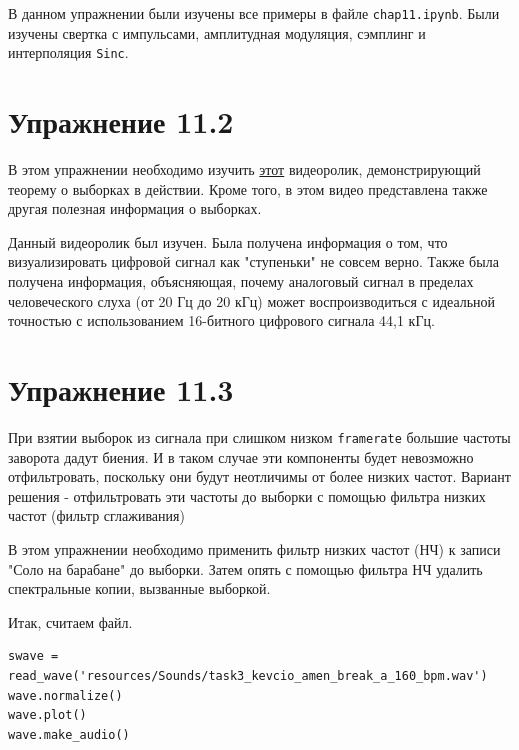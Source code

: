\documentclass[a4paper, 14pt]{extarticle}
\begin{document}
    В данном упражнении были изучены все примеры в файле \texttt{chap11.ipynb}. Были изучены свертка с импульсами,
    амплитудная модуляция, сэмплинг и интерполяция \texttt{Sinc}.

    \newpage
    \section{Упражнение 11.2}
    \label{sec:task2}

    В этом упражнении необходимо изучить \href{https://www.youtube.com/watch?v=cIQ9IXSUzuM}{этот} видеоролик,
    демонстрирующий теорему о выборках в действии. Кроме того, в этом видео представлена также другая полезная информация
    о выборках.

    Данный видеоролик был изучен. Была получена информация о том, что визуализировать цифровой сигнал как "ступеньки"
    не совсем верно. Также была получена информация, объясняющая, почему аналоговый сигнал в пределах человеческого
    слуха (от 20 Гц до 20 кГц) может воспроизводиться с идеальной точностью с использованием 16-битного цифрового сигнала
    44,1 кГц.


    \newpage
    \section{Упражнение 11.3}
    \label{sec:task3}

    При взятии выборок из сигнала при слишком низком \texttt{framerate} большие частоты заворота дадут биения.
    И в таком случае эти компоненты будет невозможно отфильтровать, поскольку они будут неотличимы от более низких частот.
    Вариант решения - отфильтровать эти частоты до выборки с помощью фильтра низких частот (фильтр сглаживания)

    В этом упражнении необходимо применить фильтр низких частот (НЧ) к записи "Соло на барабане" до выборки. Затем опять
    с помощью фильтра НЧ удалить спектральные копии, вызванные выборкой.

    Итак, считаем файл.

    \begin{lstlisting}[caption= Чтение файла., label={lst:task3_wave}]
swave = read_wave('resources/Sounds/task3_kevcio_amen_break_a_160_bpm.wav')
wave.normalize()
wave.plot()
wave.make_audio()   \end{lstlisting}
\end{document}
